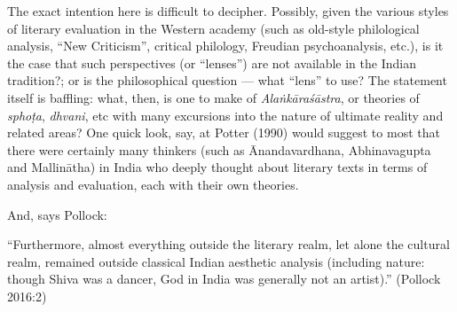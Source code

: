 The exact intention here is difficult to decipher. Possibly, given the various styles of literary evaluation in the Western academy (such as old-style philological analysis, “New Criticism”, critical philology, Freudian psychoanalysis, etc.), is it the case that such perspectives (or “lenses”) are not available in the Indian tradition?; or is the philosophical question --- what “lens” to use? The statement itself is baffling: what, then, is one to make of \textsl{Alaṅkāraśāstra}, or theories of \textsl{sphoṭa}, \textsl{dhvani}, etc with many excursions into the nature of ultimate reality and related areas? One quick look, say, at Potter (1990) would suggest to most that there were certainly many thinkers (such as Ānandavardhana, Abhinavagupta and Mallinātha) in India who deeply thought about literary texts in terms of analysis and evaluation, each with their own theories.

And, says Pollock:

\begin{myquote}
“Furthermore, almost everything outside the literary realm, let alone the cultural realm, remained outside classical Indian aesthetic analysis (including nature: though Shiva was a dancer, God in India was generally not an artist).” \hfill (Pollock 2016:2)
\end{myquote}

